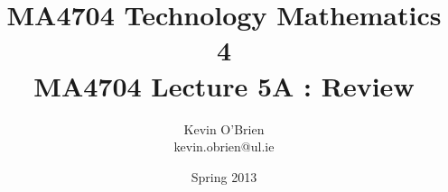 

\title[MA4704]{MA4704 Technology Mathematics 4 \\ {\normalsize MA4704 Lecture 5A : Review}}
\author[Kevin O'Brien]{Kevin O'Brien \\ {\scriptsize kevin.obrien@ul.ie}}
\date{Spring 2013}


\renewcommand{\arraystretch}{1.5}




\begin{frame}
\titlepage
\end{frame}

